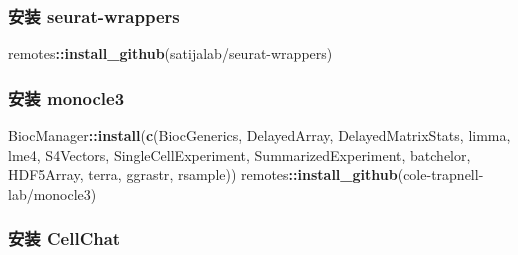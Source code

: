 \documentclass[
]{article}
\newenvironment{Shaded}{\begin{snugshade}}{\end{snugshade}}
\newcommand{\KeywordTok}[1]{\textcolor[rgb]{0.13,0.29,0.53}{\textbf{#1}}}
\newcommand{\NormalTok}[1]{#1}
\newcommand{\OperatorTok}[1]{\textcolor[rgb]{0.81,0.36,0.00}{\textbf{#1}}}
\newcommand{\StringTok}[1]{\textcolor[rgb]{0.31,0.60,0.02}{#1}}
\begin{document}
\hypertarget{ux5b89ux88c5-seurat-wrappers}{%
\subsubsection{安装 seurat-wrappers}\label{ux5b89ux88c5-seurat-wrappers}}

\begin{Shaded}
\begin{Highlighting}[]
\NormalTok{remotes}\OperatorTok{::}\KeywordTok{install\_github}\NormalTok{(}\StringTok{\textquotesingle{}satijalab/seurat{-}wrappers\textquotesingle{}}\NormalTok{)}
\end{Highlighting}
\end{Shaded}

\hypertarget{ux5b89ux88c5-monocle3}{%
\subsubsection{安装 monocle3}\label{ux5b89ux88c5-monocle3}}

\begin{Shaded}
\begin{Highlighting}[]
\NormalTok{BiocManager}\OperatorTok{::}\KeywordTok{install}\NormalTok{(}\KeywordTok{c}\NormalTok{(}\StringTok{\textquotesingle{}BiocGenerics\textquotesingle{}}\NormalTok{, }\StringTok{\textquotesingle{}DelayedArray\textquotesingle{}}\NormalTok{, }\StringTok{\textquotesingle{}DelayedMatrixStats\textquotesingle{}}\NormalTok{,}
    \StringTok{\textquotesingle{}limma\textquotesingle{}}\NormalTok{, }\StringTok{\textquotesingle{}lme4\textquotesingle{}}\NormalTok{, }\StringTok{\textquotesingle{}S4Vectors\textquotesingle{}}\NormalTok{, }\StringTok{\textquotesingle{}SingleCellExperiment\textquotesingle{}}\NormalTok{,}
    \StringTok{\textquotesingle{}SummarizedExperiment\textquotesingle{}}\NormalTok{, }\StringTok{\textquotesingle{}batchelor\textquotesingle{}}\NormalTok{, }\StringTok{\textquotesingle{}HDF5Array\textquotesingle{}}\NormalTok{,}
    \StringTok{\textquotesingle{}terra\textquotesingle{}}\NormalTok{, }\StringTok{\textquotesingle{}ggrastr\textquotesingle{}}\NormalTok{, }\StringTok{\textquotesingle{}rsample\textquotesingle{}}\NormalTok{))}
\NormalTok{remotes}\OperatorTok{::}\KeywordTok{install\_github}\NormalTok{(}\StringTok{\textquotesingle{}cole{-}trapnell{-}lab/monocle3\textquotesingle{}}\NormalTok{)}
\end{Highlighting}
\end{Shaded}

\hypertarget{ux5b89ux88c5-cellchat}{%
\subsubsection{安装 CellChat}\label{ux5b89ux88c5-cellchat}}
\end{document}
